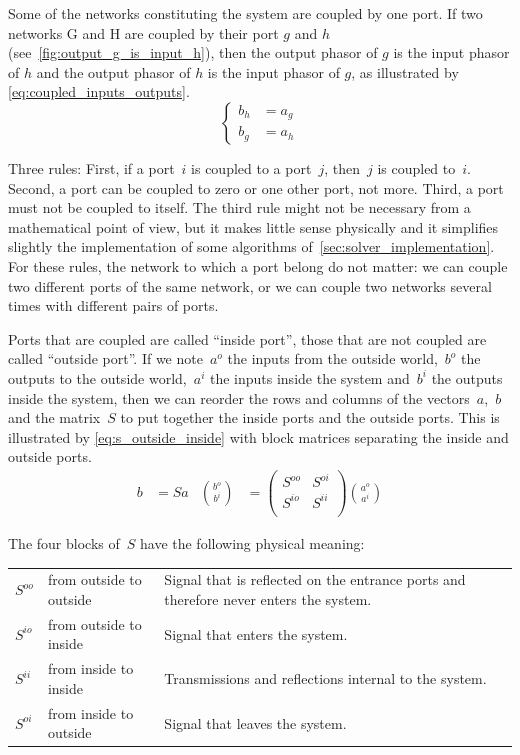 Some of the networks constituting the system are coupled by one port.
If two networks G and H are coupled by their port $g$ and $h$ (see~\cref{fig:output_g_is_input_h}), then the output phasor of $g$ is the input phasor of $h$ and the output phasor of $h$ is the input phasor of $g$, as illustrated by \cref{eq:coupled_inputs_outputs}.
\begin{equation}
    \left\lbrace
    \begin{aligned}
        b_h &= a_g \\
        b_g &= a_h
    \end{aligned}
    \right.
    \label{eq:coupled_inputs_outputs}
\end{equation}

Three rules: First, if a port~$i$ is coupled to a port~$j$, then~$j$ is coupled to~$i$.
Second, a port can be coupled to zero or one other port, not more.
Third, a port must not be coupled to itself.
The third rule might not be necessary from a mathematical point of view, but it makes little sense physically and it simplifies slightly the implementation of some algorithms of~\cref{sec:solver_implementation}.
For these rules, the network to which a port belong do not matter: we can couple two different ports of the same network, or we can couple two networks several times with different pairs of ports.

Ports that are coupled are called ``inside port'', those that are not coupled are called ``outside port''.
If we note~$a^o$ the inputs from the outside world,~$b^o$ the outputs to the outside world,~$a^i$ the inputs inside the system and~$b^i$ the outputs inside the system, then we can reorder the rows and columns of the vectors~$a$,~$b$ and the matrix~$S$ to put together the inside ports and the outside ports.
This is illustrated by \cref{eq:s_outside_inside} with block matrices separating the inside and outside ports.
\begin{align}
    b&=Sa
    &
    \binom{b^o}{b^i} &=
    \begin{pmatrix}
        S^{oo} & S^{oi} \\
        S^{io} & S^{ii} \\
    \end{pmatrix}
    \binom{a^o}{a^i}
    \label{eq:s_outside_inside}
\end{align}

The four blocks of~$S$ have the following physical meaning:

\begin{table}[H]
    \centering
    \begin{tabularx}{\textwidth}{l l X}
        $S^{oo}$ & from outside to outside & Signal that is reflected on the entrance ports and therefore never enters the system.\\
        $S^{io}$ & from outside to inside & Signal that enters the system.\\
        $S^{ii}$ & from inside to inside & Transmissions and reflections internal to the system.\\
        $S^{oi}$ & from inside to outside & Signal that leaves the system.\\
    \end{tabularx}
\end{table}

